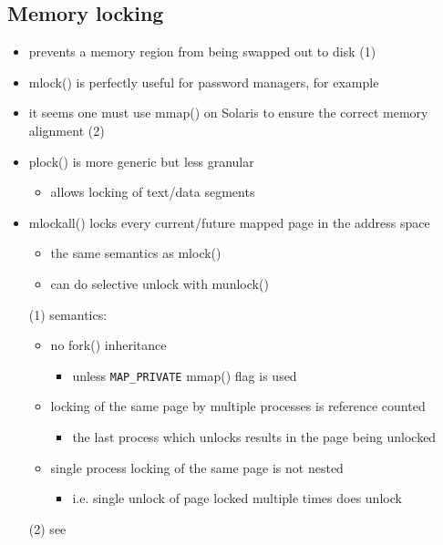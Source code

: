 
\subsection{Memory locking}

\begin{itemize}
  \item prevents a memory region from being swapped out to disk (1)
  \item mlock() is perfectly useful for password managers, for example
  \item it seems one must use mmap() on Solaris to ensure the correct
    memory alignment (2)
  \item plock() is more generic but less granular
    \begin{itemize}
      \item allows locking of text/data segments
    \end{itemize}
  \item mlockall() locks every current/future mapped page in the address space
    \begin{itemize}
      \item the same semantics as mlock()
      \item can do selective unlock with munlock()
    \end{itemize}
\end{itemize}


\begin{itemize}
\item[(1)] semantics:
  \begin{itemize}
  \item no fork() inheritance
    \begin{itemize}
    \item unless \texttt{MAP\_PRIVATE} mmap() flag is used
    \end{itemize}
  \item locking of the same page by multiple processes is reference counted
    \begin{itemize}
    \item the last process which unlocks results in the page being unlocked
    \end{itemize}
  \item single process locking of the same page is not nested
    \begin{itemize}
    \item i.e. single unlock of page locked multiple times does unlock
    \end{itemize}
  \end{itemize}
  \item[(2)] see 
\end{itemize}

